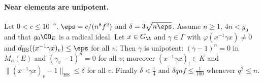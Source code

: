 \paragraph{Near elements are unipotent.}

\begin{lemma}\label{pf:rows:nearunip}
Let $0<c\le10^{-5}$, $\eps=c/(n^8f^2)$ and $\delta=3\sqrt{n\eps}$. Assume $n\ge1$, $4n<g_0$ and that $g_0\OO_E$ is a
radical ideal. Let $x\in\rowsGA$ and $\gamma\in\Gamma$ with $\varphi(x^{-1}\gamma x)\ne0$ and $\rowsdHS((x^{-1}\gamma x)_v)\le\eps$
for all $v$. Then $\gamma$ is unipotent: $(\gamma-1)^n=0$ in $M_n(E)$ and $(\gamma_v-1)^n=0$ for all $v$; moreover
$(x^{-1}\gamma x)_{\mathrm f}\in K$ and $\|(x^{-1}\gamma x)_v-1\|_{\mathrm{HS}}\le\delta$ for all $v$. Finally $\delta<\frac14$ and
$\delta qnf\le\frac1{100}$ whenever $q^2\le n$.
\end{lemma}

